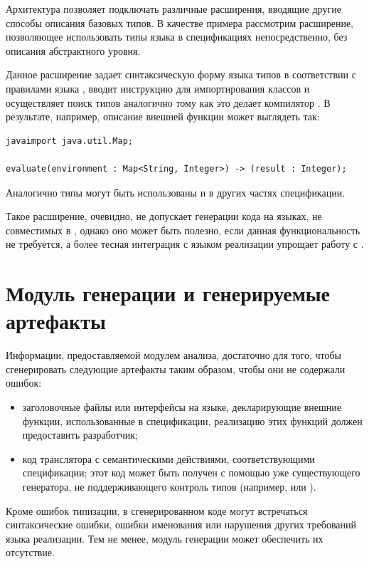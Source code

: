 Архитектура \ATF{} позволяет подключать различные расширения, вводящие другие способы описания базовых типов. В качестве примера рассмотрим расширение, позволяющее использовать типы языка  в спецификациях \ATF{} непосредственно, без описания абстрактного уровня.

Данное расширение задает синтаксическую форму языка типов в соответствии с правилами языка , вводит инструкцию  для импортирования классов и осуществляет поиск типов аналогично тому как это делает компилятор . В результате, например, описание внешней функции может выглядеть так:
\begin{lstlisting}[language=Grammatic,emph={javaimport},emphstyle={\bf}]
javaimport java.util.Map;

evaluate(environment : Map<String, Integer>) -> (result : Integer);
\end{lstlisting}
Аналогично типы могут быть использованы и в других частях спецификации.

Такое расширение, очевидно, не допускает генерации кода на языках, не совместимых в , однако оно может быть полезно, если данная функциональность не требуется, а более тесная интеграция с языком реализации упрощает работу с \ATF{}.

\section{Модуль генерации и генерируемые артефакты}

Информации, предоставляемой модулем анализа, достаточно для того, чтобы сгенерировать следующие артефакты таким образом, чтобы они не содержали ошибок:
\begin{itemize}
\item заголовочные файлы или интерфейсы на языке, декларирующие внешние функции, использованные в спецификации, реализацию этих функций должен предоставить разработчик;
\item код транслятора с семантическими действиями, соответствующими спецификации; этот код может быть получен с помощью уже существующего генератора, не поддерживающего контроль типов (например,  или ).
\end{itemize}

Кроме ошибок типизации, в сгенерированном коде могут встречаться синтаксические ошибки, ошибки именования или нарушения других требований языка реализации. Тем не менее, модуль генерации может обеспечить их отсутствие. 

